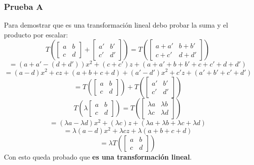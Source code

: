 \documentclass[a4paper,12pt]{article}
\begin{document}
\subsubsection{Prueba A}
Para demostrar que es una transformación lineal debo probar la suma y el producto por escalar:
$$
T \left ( \begin{bmatrix} a & b \\ c & d \end{bmatrix} + \begin{bmatrix} a' & b' \\ c' & d' \end{bmatrix} \right ) = T \left ( \begin{bmatrix} a+a' & b+b' \\ c+c' & d+d' \end{bmatrix} \right )
$$
$$
= (a+a'-(d+d'))x^2+(c+c')z+(a+a'+b+b'+c+c'+d+d')
$$
$$
= (a-d)x^2+cz+(a+b+c+d)+(a'-d')x^2+c'z+(a'+b'+c'+d')
$$
$$
= T \left ( \begin{bmatrix} a & b \\ c & d \end{bmatrix} \right ) + T \left ( \begin{bmatrix} a' & b' \\ c' & d' \end{bmatrix} \right )
$$
$$
T \left ( \lambda \begin{bmatrix} a & b \\ c & d \end{bmatrix} \right ) = T \left ( \begin{bmatrix} \lambda a & \lambda b \\ \lambda c & \lambda d \end{bmatrix} \right )
$$
$$
= (\lambda a-\lambda d)x^2+(\lambda c)z+(\lambda a+\lambda b+\lambda c+\lambda d)
$$
$$
= \lambda (a-d)x^2+\lambda cz+\lambda (a+b+c+d)
$$
$$
= \lambda T \left ( \begin{bmatrix} a & b \\ c & d \end{bmatrix} \right )
$$
Con esto queda probado que \textbf{es una transformación lineal}.
\end{document}
